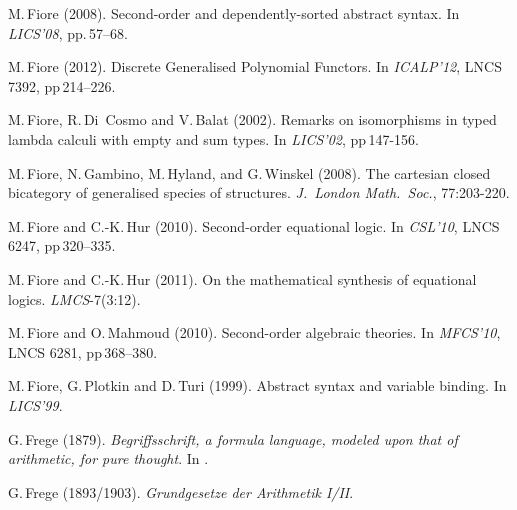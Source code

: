 \documentclass[11pt,twocolumn]{article}
\newcommand{\hide}[1]{}
\begin{document}
{\begin{thebibliography}{000}

M.\,Fiore (2008).
\newblock Second-order and dependently-sorted abstract syntax. 
\newblock In \emph{LICS'08}, pp.\,57--68. 

M.\,Fiore (2012).   
\newblock Discrete Generalised Polynomial Functors.  
\newblock In \emph{ICALP'12}, LNCS 7392, pp\,214--226.

M.\,Fiore, R.\,Di~Cosmo and V.\,Balat (2002). 
\newblock Remarks on isomorphisms in typed lambda calculi with empty and
sum types.  
\newblock In \emph{LICS'02}, pp\,147-156.  

M.\,Fiore, N.\,Gambino, M.\,Hyland, and G.\,Winskel (2008).   
\newblock The cartesian closed bicategory of generalised species of
structures.
\newblock \emph{J.\ London Math.\ Soc.}, 77:203-220. 

M.\,Fiore and C.-K.\,Hur (2010).   
\newblock Second-order equational logic.  
\newblock In \emph{CSL'10}, LNCS 6247, pp\,320--335. 
  
M.\,Fiore and C.-K.\,Hur (2011).   
\newblock On the mathematical synthesis of equational logics.
\newblock \emph{LMCS}-7(3:12).

M.\,Fiore and O.\,Mahmoud (2010).   
\newblock Second-order algebraic theories.  
\newblock In \emph{MFCS'10}, LNCS 6281, pp\,368--380. 

\hide{
\bibitem{CompleteCuboidalSets}
M.\,Fiore, G.\,Plotkin and A.J.\,Power (1997). 
\newblock Complete cuboidal sets in axiomatic domain theory.  
\newblock In \emph{LICS'97}.
}

M.\,Fiore, G.\,Plotkin and D.\,Turi (1999). 
\newblock Abstract syntax and variable binding.
\newblock In \emph{LICS'99}.

G.\,Frege (1879).
\newblock \emph{Begriffsschrift, a formula language, modeled upon that of
  arithmetic, for pure thought}. 
\newblock In \emph{\cite{vanHeijenoort}}. 

G.\,Frege (1893/1903).
\newblock 
\emph{Grundgesetze der Arithmetik I/II}.


\end{thebibliography}}
\end{document}
